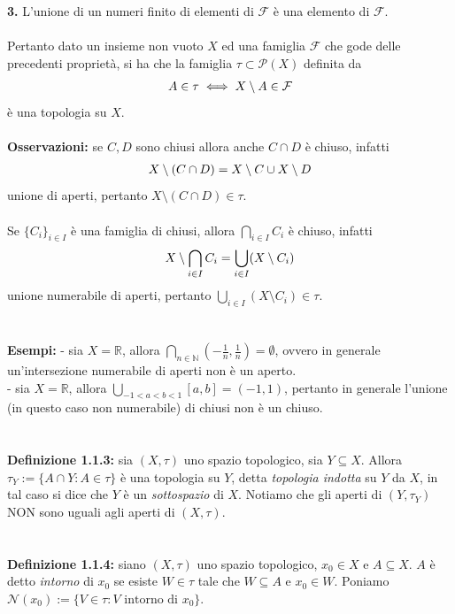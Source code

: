 \documentclass{article}
\begin{document}
\textbf{3.} L'unione di un numeri finito di elementi di $\mathcal{F}$ è una elemento di $\mathcal{F}$. \\ \\
Pertanto dato un insieme non vuoto $X$ ed una famiglia $\mathcal{F}$ che gode delle precedenti proprietà, si ha che la famiglia $\tau \subset \mathcal{P}(X)$ definita da
\begin{gather}
    A \in \tau \iff X \setminus A \in \mathcal{F} \notag
\end{gather}
è una topologia su $X$. \\ \\
\textbf{Osservazioni:} se $C, D$ sono chiusi allora anche $C \cap D$ è chiuso, infatti
\begin{gather}
    X \setminus (C \cap D) = X \setminus C \cup X \setminus D \notag
\end{gather}
unione di aperti, pertanto $X \setminus (C \cap D) \in \tau$. \\ \\
Se $\{ C_i \}_{i \in I}$ è una famiglia di chiusi, allora $\bigcap_{i \in I} C_i$ è chiuso, infatti
\begin{gather}
    X \setminus \bigcap_{i \in I} C_i = \bigcup_{i \in I} (X \setminus C_i) \notag
\end{gather}
unione numerabile di aperti, pertanto $\bigcup_{i \in I} (X \setminus C_i) \in \tau$. \\ \\ \\
\textbf{Esempi:} - sia $X = \mathbb{R}$, allora $\bigcap_{n \in \mathbb{N}} \left(-\frac{1}{n}, \frac{1}{n}\right) = \emptyset$, ovvero in generale un'intersezione numerabile di aperti non è un aperto. \\
- sia $X = \mathbb{R}$, allora $\bigcup_{-1 < a < b < 1} [a, b] = (-1, 1)$, pertanto in generale l'unione (in questo caso non numerabile) di chiusi non è un chiuso. \\ \\ \\
\textbf{Definizione 1.1.3:} sia $(X, \tau)$ uno spazio topologico, sia $Y \subseteq X$. Allora $\tau_Y := \{ A \cap Y : A \in \tau \}$ è una topologia su $Y$, detta \textit{topologia indotta} su $Y$ da $X$, in tal caso si dice che $Y$ è un \textit{sottospazio} di $X$. Notiamo che gli aperti di $(Y, \tau_Y)$ NON sono uguali agli aperti di $(X, \tau)$. \\ \\ \\
\textbf{Definizione 1.1.4:} siano $(X, \tau)$ uno spazio topologico, $x_0 \in X$ e $A \subseteq X$. $A$ è detto \textit{intorno} di $x_0$ se esiste $W \in \tau$ tale che $W \subseteq A$ e $x_0 \in W$. Poniamo $\mathcal{N}(x_0) := \{ V \in \tau : V \text{ intorno di } x_0 \}$. \\ \\
\end{document}
